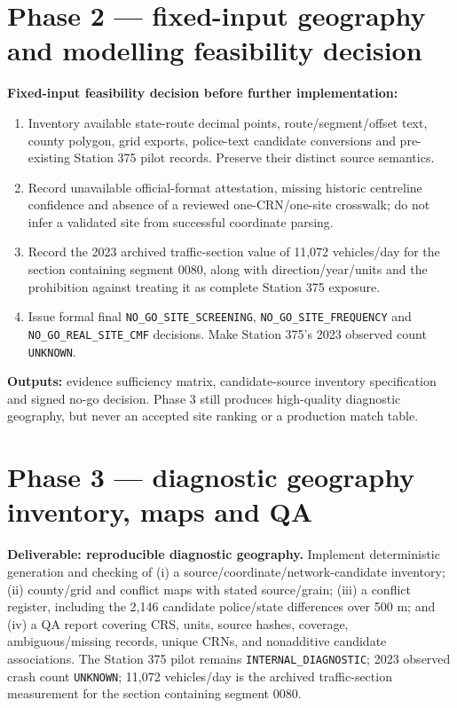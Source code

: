 \documentclass[11pt,a4paper,openany]{report}
\newcommand{\pathcode}[1]{\nolinkurl{#1}}
\begin{document}
\section{Phase 2 --- fixed-input geography and modelling feasibility decision}
\textbf{Fixed-input feasibility decision before further implementation:}
\begin{enumerate}
\item Inventory available state-route decimal points, route/segment/offset text, county polygon, grid exports, police-text candidate conversions and pre-existing Station 375 pilot records. Preserve their distinct source semantics.
\item Record unavailable official-format attestation, missing historic centreline confidence and absence of a reviewed one-CRN/one-site crosswalk; do not infer a validated site from successful coordinate parsing.
\item Record the 2023 archived traffic-section value of 11,072 vehicles/day for the section containing segment 0080, along with direction/year/units and the prohibition against treating it as complete Station 375 exposure.
\item Issue formal final \pathcode{NO_GO_SITE_SCREENING}, \pathcode{NO_GO_SITE_FREQUENCY} and \pathcode{NO_GO_REAL_SITE_CMF} decisions. Make Station 375's 2023 observed count \pathcode{UNKNOWN}.
\end{enumerate}
\textbf{Outputs:} evidence sufficiency matrix, candidate-source inventory specification and signed no-go decision. Phase 3 still produces high-quality diagnostic geography, but never an accepted site ranking or a production match table.

\section{Phase 3 --- diagnostic geography inventory, maps and QA}
\textbf{Deliverable: reproducible diagnostic geography.} Implement deterministic generation and checking of (i) a source/coordinate/network-candidate inventory; (ii) county/grid and conflict maps with stated source/grain; (iii) a conflict register, including the 2,146 candidate police/state differences over 500 m; and (iv) a QA report covering CRS, units, source hashes, coverage, ambiguous/missing records, unique CRNs, and nonadditive candidate associations. The Station 375 pilot remains \pathcode{INTERNAL_DIAGNOSTIC}; 2023 observed crash count \pathcode{UNKNOWN}; 11,072 vehicles/day is the archived traffic-section measurement for the section containing segment 0080.
\end{document}
